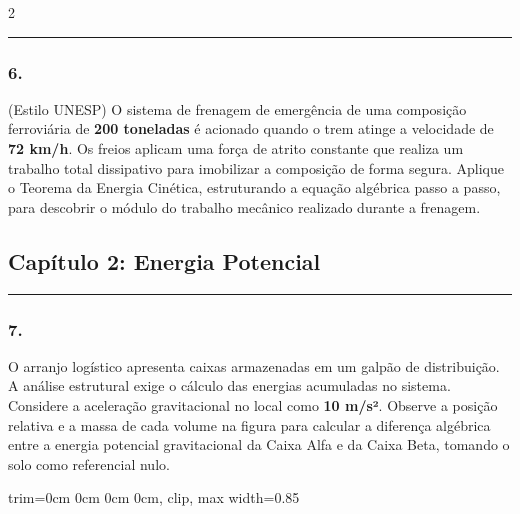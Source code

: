\documentclass[twoside, 10pt, a4paper]{article}
\newlength{\espacoPosTitulo}\setlength{\espacoPosTitulo}{0.3cm}
\newlength{\espacoPreQuestao}\setlength{\espacoPreQuestao}{0.1cm}
\newlength{\espacoQuestao}\setlength{\espacoQuestao}{0.2cm}
\newcommand{\larguraTikz}{0.85\linewidth}
\begin{document}
\begin{multicols*}{2}
\noindent\textcolor{CorLinha}{\rule{\linewidth}{0.5pt}} 
\par\vspace{\espacoPreQuestao}
\subsubsection*{6.} (Estilo UNESP) O sistema de frenagem de emergência de uma composição ferroviária de \textbf{200 toneladas} é acionado quando o trem atinge a velocidade de \textbf{72 km/h}. Os freios aplicam uma força de atrito constante que realiza um trabalho total dissipativo para imobilizar a composição de forma segura. Aplique o Teorema da Energia Cinética, estruturando a equação algébrica passo a passo, para descobrir o módulo do trabalho mecânico realizado durante a frenagem.
\par\vspace{\espacoQuestao}

\subsection*{Capítulo 2: Energia Potencial}
\vspace{-0.2cm}\noindent\rule{\linewidth}{1.5pt} 
\par\vspace{\espacoPosTitulo}
\subsubsection*{7.} O arranjo logístico apresenta caixas armazenadas em um galpão de distribuição. A análise estrutural exige o cálculo das energias acumuladas no sistema. Considere a aceleração gravitacional no local como \textbf{10 m/s²}. Observe a posição relativa e a massa de cada volume na figura para calcular a diferença algébrica entre a energia potencial gravitacional da Caixa Alfa e da Caixa Beta, tomando o solo como referencial nulo.
\begin{center}
\begin{adjustbox}{trim=0cm 0cm 0cm 0cm, clip, max width=\larguraTikz}
\end{adjustbox}
\end{center}
\end{multicols*}
\end{document}
